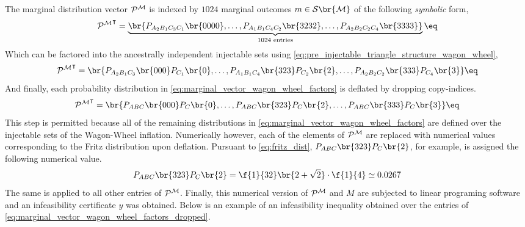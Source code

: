 \documentclass[aps, 10pt, english, twoside, pra, nofootinbib, tightenlines, longbibliography, superscriptaddress]{revtex4-1}
\renewcommand{\Events}[1]{\mathcal{S}\br{#1}} %
\begin{document}
    The marginal distribution vector $\probvec^{\mscenario}$ is indexed by $1024$ marginal outcomes $m \in \Events{\mscenario}$ of the following \textit{symbolic} form,
    \[ {\probvec^{\mscenario}}^{\intercal} = \underbrace{\br{\prob[A_2B_1C_3C_1]\br{0000}, \ldots, \prob[A_1B_1C_4C_2]\br{3232}, \ldots, \prob[A_2B_2C_2C_4]\br{3333}}}_{1024 \text{ entries}} \eq \label{eq:marginal_vector_wagon_wheel} \]
    Which can be factored into the ancestrally independent injectable sets using \cref{eq:pre_injectable_triangle_structure_wagon_wheel},
    \[ {\probvec^{\mscenario}}^{\intercal} = \br{\prob[A_2B_1C_3]\br{000}\prob[C_1]\br{0}, \ldots, \prob[A_1B_1C_4]\br{323}\prob[C_2]\br{2}, \ldots, \prob[A_2B_2C_2]\br{333}\prob[C_4]\br{3}} \eq \label{eq:marginal_vector_wagon_wheel_factors}\]
    And finally, each probability distribution in \cref{eq:marginal_vector_wagon_wheel_factors} is deflated by dropping copy-indices.
    \[ {\probvec^{\mscenario}}^{\intercal} = \br{\prob[ABC]\br{000}\prob[C]\br{0}, \ldots, \prob[ABC]\br{323}\prob[C]\br{2}, \ldots, \prob[ABC]\br{333}\prob[C]\br{3}} \eq \label{eq:marginal_vector_wagon_wheel_factors_dropped}\]
    This step is permitted because all of the remaining distributions in \cref{eq:marginal_vector_wagon_wheel_factors} are defined over the injectable sets of the Wagon-Wheel inflation. Numerically however, each of the elements of $\probvec^{\mscenario}$ are replaced with numerical values corresponding to the Fritz distribution upon deflation. Pursuant to \cref{eq:fritz_dist}, $\prob[ABC]\br{323}\prob[C]\br{2}$, for example, is assigned the following numerical value.
    \[ \prob[ABC]\br{323}\prob[C]\br{2} = \f{1}{32}\br{2 + \sqrt{2}} \cdot \f{1}{4} \simeq 0.0267  \]
    The same is applied to all other entries of $\probvec^{\mscenario}$. Finally, this numerical version of $\probvec^{\mscenario}$ and $M$ are subjected to linear programing software and an infeasibility certificate $y$ was obtained. Below is an example of an infeasibility inequality obtained over the entries of \cref{eq:marginal_vector_wagon_wheel_factors_dropped}.
\end{document}
